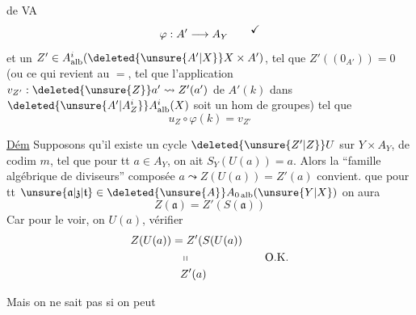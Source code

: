 de VA
\[
\varphi:A'\longrightarrow A_Y
\qquad\text{\raisebox{1ex}{$\checkmark$}}
\]
et un $Z'\in A^i_{\mathrm{alb}}(\deleted{\unsure{A'|X}}X\times A')$,  tel que
$Z'((0_{A'}))=0$  (ou ce qui revient au $=$, tel que
l'application $v_{Z'}:\deleted{\unsure{Z}}a'\leadsto Z'(a')$ de $A'(k)$ dans $\deleted{\unsure{A'|A^i_Z}}A^i_{\mathrm{alb}}(X)$
soit un hom de groupes) tel que
\[
u_Z\circ\varphi(k)=v_{Z'}
\]

\uline{Dém} Supposons qu'il existe un cycle
$\deleted{\unsure{Z'|Z}}U$ sur $Y\times A_Y$, de codim $m$, tel
que pour tt $a\in A_Y$, on ait $S_Y(U(a))=a$.
Alors la ``famille algébrique de diviseurs''
composée $a\leadsto Z(U(a))=Z'(a)$
convient.  que pour tt $\unsure{\mathfrak{a}|\mathfrak{z}|\mathfrak{t}}\in\deleted{\unsure{A}}A_{0\,\mathrm{alb}}(\unsure{Y|X})$
 on aura 
\[
Z(\mathfrak{a})=Z'(S(\mathfrak{a}))
\]
Car pour le voir, on   $U(a)$,  vérifier
\[
\begin{aligned}
Z(U(a))&=Z'(S(U(a))\\
&\phantom{=}\shortparallel\\
&\phantom{=}Z'(a)
\end{aligned}
\qquad \text{O.K.}
\]

Mais  on ne sait pas si on peut
